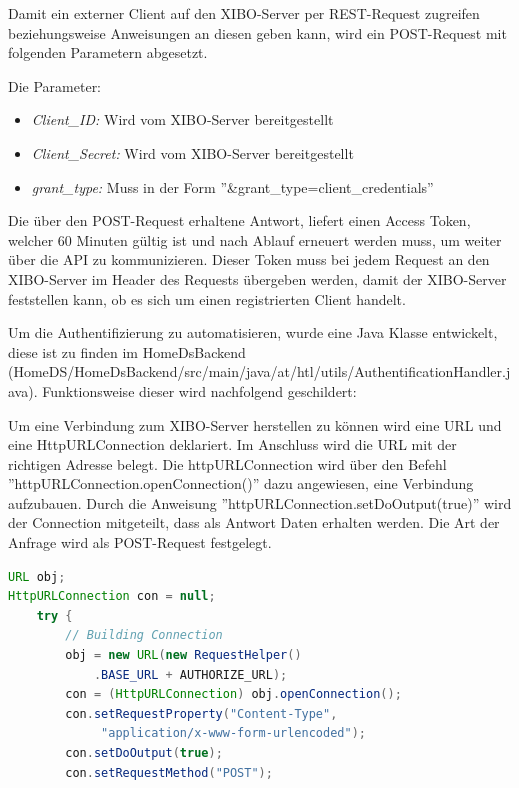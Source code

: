 Damit ein externer Client auf den XIBO-Server per REST-Request zugreifen beziehungsweise Anweisungen an diesen geben kann, wird ein POST-Request mit folgenden Parametern abgesetzt.

Die Parameter: 
\begin{itemize}
	\item {\em Client\_ID:} Wird vom XIBO-Server bereitgestellt
	\item {\em Client\_Secret:} Wird vom XIBO-Server bereitgestellt
	\item{\em grant\_type:} Muss in der Form ''&grant\_type=client\_credentials''
\end{itemize}

Die über den POST-Request erhaltene Antwort, liefert einen Access Token, welcher 60 Minuten gültig ist und nach Ablauf erneuert werden muss, um weiter über die API zu kommunizieren.
Dieser Token muss bei jedem Request an den XIBO-Server im Header des Requests übergeben werden, damit der XIBO-Server feststellen kann, ob es sich um einen registrierten Client handelt.


Um die Authentifizierung zu automatisieren, wurde eine Java Klasse entwickelt, diese ist zu finden im HomeDsBackend (HomeDS/HomeDsBackend/src/main/java/at/htl/utils/AuthentificationHandler.java). Funktionsweise dieser wird nachfolgend geschildert: 

Um eine Verbindung zum XIBO-Server herstellen zu können wird eine URL und eine HttpURLConnection deklariert. Im Anschluss wird die URL mit der richtigen Adresse belegt. Die httpURLConnection wird über den Befehl ''httpURLConnection.openConnection()'' dazu angewiesen, eine Verbindung aufzubauen. Durch die Anweisung ''httpURLConnection.setDoOutput(true)'' wird der Connection mitgeteilt, dass als Antwort Daten erhalten werden. Die Art der Anfrage wird als POST-Request festgelegt.  \citep{httpurlconnection}

\begin{lstlisting}[language=Java,caption={Erstellen der Verbindung zum Server}]
URL obj;
HttpURLConnection con = null;
	try {
    	// Building Connection
        obj = new URL(new RequestHelper()
        	.BASE_URL + AUTHORIZE_URL);
       	con = (HttpURLConnection) obj.openConnection();
        con.setRequestProperty("Content-Type",
             "application/x-www-form-urlencoded");    
        con.setDoOutput(true);
        con.setRequestMethod("POST");
\end{lstlisting}

